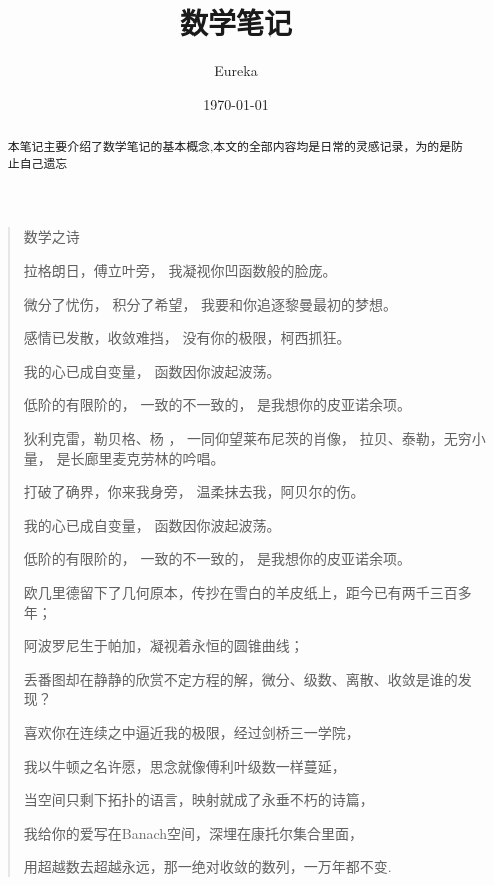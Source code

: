 \documentclass[fontset=windows]{article}
\title{数学笔记}
\author{Eureka}
\date{\today}
\begin{document}
    \maketitle
    \begin{center}
        \tableofcontents
        \thispagestyle{empty}
        
        \thispagestyle{empty}
    \end{center}

    \newpage
    \thispagestyle{empty}
    \begin{abstract}
        本笔记主要介绍了数学笔记的基本概念,本文的全部内容均是日常的灵感记录，为的是防止自己遗忘
    \end{abstract}
    \vspace*{8pt}
    \begin{quote}
    \kaishu
    \centerline{数学之诗}
    拉格朗日，傅立叶旁， 我凝视你凹函数般的脸庞。 

    微分了忧伤， 积分了希望， 我要和你追逐黎曼最初的梦想。

    感情已发散，收敛难挡， 没有你的极限，柯西抓狂。

    我的心已成自变量， 函数因你波起波荡。

    低阶的有限阶的， 一致的不一致的， 是我想你的皮亚诺余项。

    狄利克雷，勒贝格、杨 ， 一同仰望莱布尼茨的肖像， 拉贝、泰勒，无穷小量， 是长廊里麦克劳林的吟唱。

    打破了确界，你来我身旁， 温柔抹去我，阿贝尔的伤。

    我的心已成自变量， 函数因你波起波荡。

    低阶的有限阶的， 一致的不一致的， 是我想你的皮亚诺余项。

    欧几里德留下了几何原本，传抄在雪白的羊皮纸上，距今已有两千三百多年；     

    阿波罗尼生于帕加，凝视着永恒的圆锥曲线； 

    丢番图却在静静的欣赏不定方程的解，微分、级数、离散、收敛是谁的发现？         

    喜欢你在连续之中逼近我的极限，经过剑桥三一学院，

    我以牛顿之名许愿，思念就像傅利叶级数一样蔓延，

    当空间只剩下拓扑的语言，映射就成了永垂不朽的诗篇，

    我给你的爱写在Banach空间，深埋在康托尔集合里面，

    用超越数去超越永远，那一绝对收敛的数列，一万年都不变.
    \end{quote}
\end{document}
